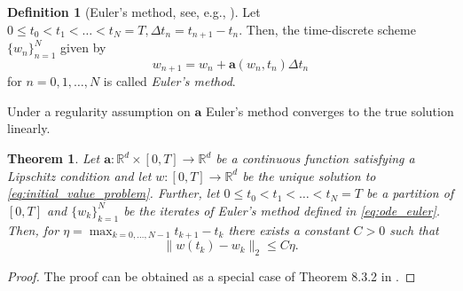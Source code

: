 \documentclass[12pt]{article}
\newtheorem{theorem}{Theorem}[section]
\theoremstyle{definition}
\newtheorem{definition}[definition]{Definition}
\numberwithin{equation}{section}
\newcommand{\R}{\mathbb{R}}
\newcommand{\norm}[1]{\lVert{#1}\rVert_2}
\begin{document}
\begin{definition}[Euler's method, see, e.g., ]
  Let $0 \leq t_0 < t_1 < \dots < t_N = T, \Delta t_n = t_{n+1} - t_n$. Then, the time-discrete scheme $\{w_n\}_{n=1}^N$ given by
  \begin{equation}
    \label{eq:ode_euler}
    w_{n+1} = w_n + \mathbf{a}(w_n, t_n) \Delta t_n
  \end{equation}
  for $n=0,1,\dots,N$ is called \emph{Euler's method}.
\end{definition}
Under a regularity assumption on $\mathbf{a}$ Euler's method converges to the true solution linearly.
\begin{theorem}
  \label{thm:euler_convergence}
  Let $\mathbf{a} : \R^d \times [0,T] \rightarrow \R^d$ be a continuous function satisfying a Lipschitz condition and let $w:[0,T] \rightarrow \R^d$ be the unique solution to \eqref{eq:initial_value_problem}. Further, let $0 \leq t_0 < t_1 < \dots < t_N = T$ be a partition of $[0,T]$ and $\{w_k\}_{k=1}^N$ be the iterates of Euler's method defined in \eqref{eq:ode_euler}. Then, for $\eta = \max_{k=0,\dots,N-1} t_{k+1} - t_k$ there exists a constant $C > 0$ such that
  \begin{equation*}
    \norm{w(t_k) - w_k} \leq C \eta.
  \end{equation*}
\end{theorem}
\begin{proof}
  The proof can be obtained as a special case of Theorem 8.3.2 in \cite[pp.~294]{kloedenNumericalSolutionStochastic2013}.
\end{proof}
\end{document}
